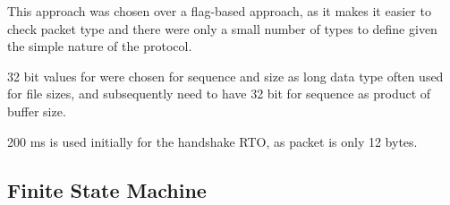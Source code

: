 \documentclass[12pt]{article}
\begin{document}
This approach was chosen over a flag-based approach, as it makes it easier to check packet type and there were only a small number of types to define given the simple nature of the protocol.

32 bit values for were chosen for sequence and size as long data type often used for file sizes, and subsequently need to have 32 bit for sequence as product of buffer size.

200 ms is used initially for the handshake RTO, as packet is only 12 bytes.

\subsection{Finite State Machine}




\end{document}
